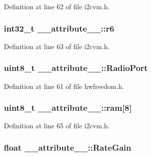 \-Definition at line 62 of file i2cvm.\-h.

\hypertarget{struct____attribute_____a1a5dfb1ec102e7fad7f2ac0396b0f90b}{
\subsubsection[{r6}]{\setlength{\rightskip}{0pt plus 5cm}int32\-\_\-t {\bf \-\_\-\-\_\-attribute\-\_\-\-\_\-\-::r6}}}\label{struct____attribute_____a1a5dfb1ec102e7fad7f2ac0396b0f90b}


\-Definition at line 63 of file i2cvm.\-h.

\hypertarget{struct____attribute_____a26d6cfd3082838b681d85f58eacfe535}{
\subsubsection[{\-Radio\-Port}]{\setlength{\rightskip}{0pt plus 5cm}uint8\-\_\-t {\bf \-\_\-\-\_\-attribute\-\_\-\-\_\-\-::\-Radio\-Port}}}\label{struct____attribute_____a26d6cfd3082838b681d85f58eacfe535}


\-Definition at line 61 of file hwfreedom.\-h.

\hypertarget{struct____attribute_____a55beff1438552db55c1742d51d085ae4}{
\subsubsection[{ram}]{\setlength{\rightskip}{0pt plus 5cm}uint8\-\_\-t {\bf \-\_\-\-\_\-attribute\-\_\-\-\_\-\-::ram}\mbox{[}8\mbox{]}}}\label{struct____attribute_____a55beff1438552db55c1742d51d085ae4}


\-Definition at line 65 of file i2cvm.\-h.

\hypertarget{struct____attribute_____ac26050e5ce9a16045d872d313d5d02fc}{
\subsubsection[{\-Rate\-Gain}]{\setlength{\rightskip}{0pt plus 5cm}float {\bf \-\_\-\-\_\-attribute\-\_\-\-\_\-\-::\-Rate\-Gain}}}\label{struct____attribute_____ac26050e5ce9a16045d872d313d5d02fc}


